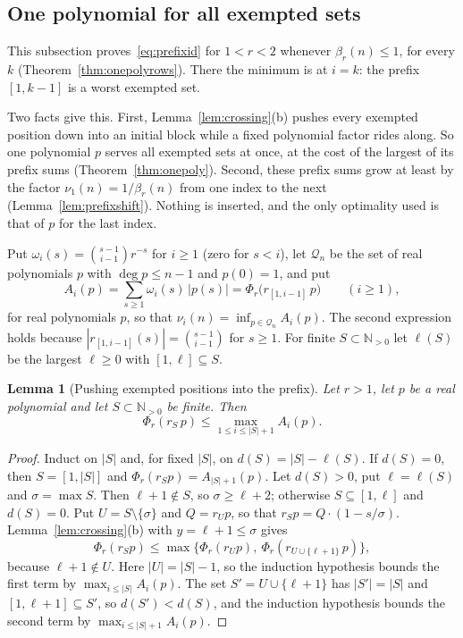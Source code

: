 \documentclass[11pt]{article}
\newtheorem{lemma}[theorem]{Lemma}
\newcommand{\N}{\mathbb N}
\begin{document}
\subsection{One polynomial for all exempted sets}\label{sec:onepoly}

This subsection proves~\eqref{eq:prefixid} for $1<r<2$ whenever $\beta_r(n)\le1$,
for every $k$ (Theorem~\ref{thm:onepolyrows}).  There the minimum is at
$i=k$: the prefix $[1,k-1]$ is a worst exempted set.

Two facts give this.  First, Lemma~\ref{lem:crossing}(b) pushes every
exempted position down into an initial block while a fixed polynomial factor
rides along.  So one polynomial $p$ serves all exempted sets at once, at the
cost of the largest of its prefix sums (Theorem~\ref{thm:onepoly}).  Second,
these prefix sums grow at least by the factor $\nu_1(n)=1/\beta_r(n)$ from
one index to the next (Lemma~\ref{lem:prefixshift}).  Nothing is inserted,
and the only optimality used is that of $p$ for the last index.

Put $\omega_i(s)=\binom{s-1}{i-1}r^{-s}$ for $i\ge1$ (zero for $s<i$),
let $\mathcal Q_n$ be the set of real polynomials $p$ with
$\deg p\le n-1$ and $p(0)=1$, and put
\[
  A_i(p)=\sum_{s\ge1}\omega_i(s)\,|p(s)|=\Phi_r\bigl(r_{[1,i-1]}\,p\bigr)
  \qquad(i\ge1),
\]
for real polynomials $p$, so that $\nu_i(n)=\inf_{p\in\mathcal Q_n}A_i(p)$.
The second expression holds because $|r_{[1,i-1]}(s)|=\binom{s-1}{i-1}$
for $s\ge1$.  For finite $S\subset\N_{>0}$ let $\ell(S)$ be the largest
$\ell\ge0$ with $[1,\ell]\subseteq S$.

\begin{lemma}[Pushing exempted positions into the prefix]\label{lem:prefixpush}
Let $r>1$, let $p$ be a real polynomial and let $S\subset\N_{>0}$ be finite.
Then
\[
  \Phi_r(r_S\,p)\le\max_{1\le i\le|S|+1}A_i(p).
\]
\end{lemma}

\begin{proof}
Induct on $|S|$ and, for fixed $|S|$, on $d(S)=|S|-\ell(S)$.  If $d(S)=0$,
then $S=[1,|S|]$ and $\Phi_r(r_Sp)=A_{|S|+1}(p)$.  Let $d(S)>0$, put
$\ell=\ell(S)$ and $\sigma=\max S$.  Then $\ell+1\notin S$, so
$\sigma\ge\ell+2$; otherwise $S\subseteq[1,\ell]$ and $d(S)=0$.  Put
$U=S\setminus\{\sigma\}$ and $Q=r_Up$, so that $r_Sp=Q\cdot(1-s/\sigma)$.
Lemma~\ref{lem:crossing}(b) with $y=\ell+1\le\sigma$ gives
\[
  \Phi_r(r_Sp)\le\max\bigl\{\Phi_r(r_Up),\ \Phi_r(r_{U\cup\{\ell+1\}}\,p)\bigr\},
\]
because $\ell+1\notin U$.  Here $|U|=|S|-1$, so the induction hypothesis
bounds the first term by $\max_{i\le|S|}A_i(p)$.  The set
$S'=U\cup\{\ell+1\}$ has $|S'|=|S|$ and $[1,\ell+1]\subseteq S'$, so
$d(S')<d(S)$, and the induction hypothesis bounds the second term by
$\max_{i\le|S|+1}A_i(p)$.
\end{proof}
\end{document}
